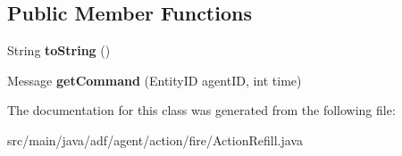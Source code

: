\subsection*{Public Member Functions}
\begin{DoxyCompactItemize}
\item 
\hypertarget{classadf_1_1agent_1_1action_1_1fire_1_1ActionRefill_aefdc3e931e79ebc71cd29bdcad939109}{}\label{classadf_1_1agent_1_1action_1_1fire_1_1ActionRefill_aefdc3e931e79ebc71cd29bdcad939109} 
String {\bfseries to\+String} ()
\item 
\hypertarget{classadf_1_1agent_1_1action_1_1fire_1_1ActionRefill_a2bed6b1eb1ece6d45e6b1526b69b337a}{}\label{classadf_1_1agent_1_1action_1_1fire_1_1ActionRefill_a2bed6b1eb1ece6d45e6b1526b69b337a} 
Message {\bfseries get\+Command} (Entity\+ID agent\+ID, int time)
\end{DoxyCompactItemize}


The documentation for this class was generated from the following file\+:\begin{DoxyCompactItemize}
\item 
src/main/java/adf/agent/action/fire/Action\+Refill.\+java\end{DoxyCompactItemize}
